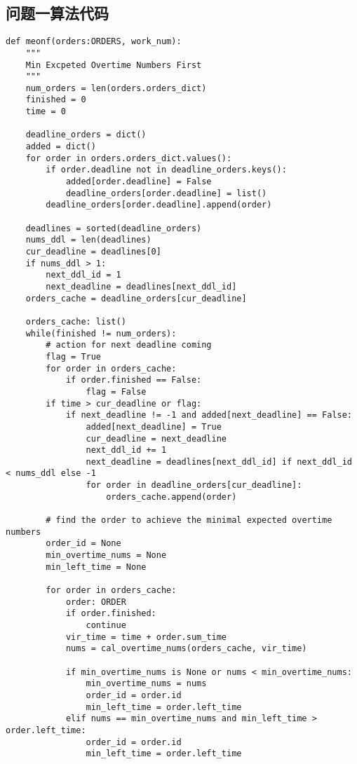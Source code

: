 \subsection{问题一算法代码}

\begin{lstlisting}[caption={meonf}, label={lst:python}]
def meonf(orders:ORDERS, work_num):
    """
    Min Excpeted Overtime Numbers First
    """
    num_orders = len(orders.orders_dict)
    finished = 0
    time = 0
    
    deadline_orders = dict()
    added = dict()
    for order in orders.orders_dict.values():
        if order.deadline not in deadline_orders.keys():
            added[order.deadline] = False
            deadline_orders[order.deadline] = list()
        deadline_orders[order.deadline].append(order)
        
    deadlines = sorted(deadline_orders)    
    nums_ddl = len(deadlines)
    cur_deadline = deadlines[0]
    if nums_ddl > 1:
        next_ddl_id = 1
        next_deadline = deadlines[next_ddl_id]
    orders_cache = deadline_orders[cur_deadline]
    
    orders_cache: list()
    while(finished != num_orders):
        # action for next deadline coming
        flag = True
        for order in orders_cache:
            if order.finished == False:
                flag = False 
        if time > cur_deadline or flag:
            if next_deadline != -1 and added[next_deadline] == False:
                added[next_deadline] = True
                cur_deadline = next_deadline
                next_ddl_id += 1
                next_deadline = deadlines[next_ddl_id] if next_ddl_id < nums_ddl else -1
                for order in deadline_orders[cur_deadline]:
                    orders_cache.append(order)

        # find the order to achieve the minimal expected overtime numbers
        order_id = None
        min_overtime_nums = None
        min_left_time = None
        
        for order in orders_cache:
            order: ORDER
            if order.finished:
                continue
            vir_time = time + order.sum_time
            nums = cal_overtime_nums(orders_cache, vir_time)
            
            if min_overtime_nums is None or nums < min_overtime_nums:
                min_overtime_nums = nums
                order_id = order.id
                min_left_time = order.left_time
            elif nums == min_overtime_nums and min_left_time > order.left_time:
                order_id = order.id
                min_left_time = order.left_time                
                 

\end{lstlisting}
